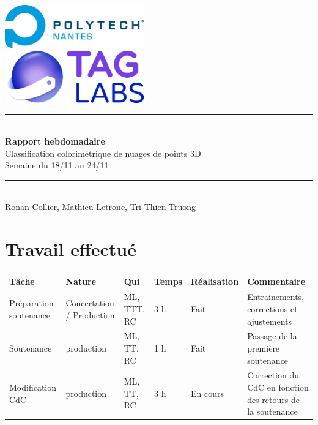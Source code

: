 \documentclass[12pt,titlepage,french]{article}
\begin{document}

\begin{titlepage}
\newcommand{\HRule}{\rule{\linewidth}{0.5mm}}
\center

  \includegraphics[width=0.45\textwidth]{img/image2.png}\\[1cm]
   
  \includegraphics[width=0.45\textwidth]{img/image1.png}


\HRule \\[0.4cm]
{ \huge \bfseries Rapport hebdomadaire\\[0.15cm] }
Classification colorimétrique de nuages de points 3D\\
Semaine du 18/11 au 24/11
\HRule \\[1.5cm]
Ronan Collier,
Mathieu Letrone,
Tri-Thien Truong
\\[1cm]
\end{titlepage}

\section{Travail effectué}

\noindent\begin{tabularx}{17cm}{|p{2.5cm}|p{2.5cm}|p{1cm}|p{1.5cm}|p{2.5cm}|X|}
    \hline
    \textbf{Tâche} & \textbf{Nature} & \textbf{Qui} & \textbf{Temps} & \textbf{Réalisation} & \textbf{Commentaire} \\
    \hline
    Préparation soutenance & Concertation / Production & ML, TTT, RC & 3 h & Fait & Entrainements, corrections et ajustements\\
    \hline
    Soutenance & production & ML, TT, RC & 1 h & Fait & Passage de la première soutenance\\
    \hline
    Modification CdC & production & ML, TT, RC & 3 h & En cours & Correction du CdC en fonction des retours de la soutenance\\
    \hline
\end{tabularx}
\end{document}

